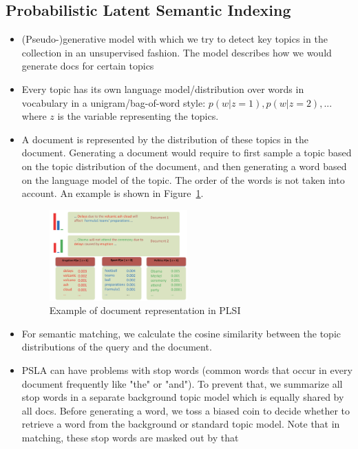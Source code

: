 \subsection{Probabilistic Latent Semantic Indexing}
\begin{itemize}
	\item (Pseudo-)generative model with which we try to detect key topics in the collection in an unsupervised fashion. The model describes how we would generate docs for certain topics
	\item Every topic has its own language model/distribution over words in vocabulary in a unigram/bag-of-word style: $p(w|z=1), p(w|z=2),...$ where $z$ is the variable representing the topics. 
	\item A document is represented by the distribution of these topics in the document. Generating a document would require to first sample a topic based on the topic distribution of the document, and then generating a word based on the language model of the topic. The order of the words is not taken into account. An example is shown in Figure~\ref{img:semantic_matching_PLSI_example}.
	\begin{figure}[ht]
		\centering
		\includegraphics[width=0.5\textwidth]{figures/semantic_matching_PLSI_example.png}
		\caption{Example of document representation in PLSI}
		\label{img:semantic_matching_PLSI_example}
	\end{figure}
	\item For semantic matching, we calculate the cosine similarity between the topic distributions of the query and the document.
	\item PSLA can have problems with stop words (common words that occur in every document frequently like "the" or "and"). To prevent that, we summarize all stop words in a separate background topic model which is equally shared by all docs. Before generating a word, we toss a biased coin to decide whether to retrieve a word from the background or standard topic model. Note that in matching, these stop words are masked out by that
\end{itemize}
